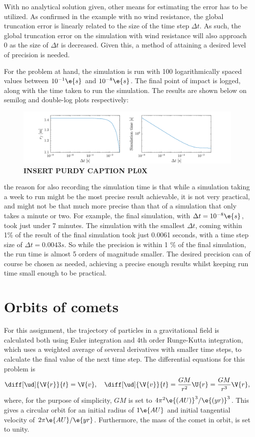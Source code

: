 \documentclass[a4paper,10pt]{article} 	%
\numberwithin{equation}{section}
\begin{document}
 	With no analytical solution given, other means for estimating the error has to be utilized. As confirmed in the example with no wind resistance, the global truncation error is linearly related to the size of the time step $ \Delta t $. As such, the global truncation error on the simulation with wind resistance will also approach 0 as the size of $ \Delta t $ is decreased. Given this, a method of attaining a desired level of precision is needed.
 	
 	For the problem at hand, the simulation is run with 100 logarithmically spaced values between $ 10^{-1} \e{s}$ and $ 10^{-8} \e{s} $. The final point of impact is logged, along with the time taken to run the simulation. The results are shown below on semilog and double-log plots respectively:
 	\begin{figure}[H]
 		\centering
 		\includegraphics[width = \linewidth]{simtime.pdf}
 		\caption{\textbf{INSERT PURDY CAPTION PL0X}}
 		\label{fig:simtime}
 	\end{figure}
 	the reason for also recording the simulation time is that while a simulation taking a week to run might be the most precise result achievable, it is not very practical, and might not be that much more precise than that of a simulation that only takes a minute or two. For example, the final simulation, with $ \Delta t = 10^{-8} \e{s} $, took just under 7 minutes. The simulation with the smallest $ \Delta t $, coming within 1\% of the result of the final simulation took just 0.0061 seconds, with a time step size of $ \Delta t = 0.0043 s $. So while the precision is within 1 \% of the final simulation, the run time is almost 5 orders of magnitude smaller. The desired precision can of course be chosen as needed, achieving a precise enough results whilst keeping run time small enough to be practical.
 	
 	
 	\section{Orbits of comets}
 	For this assignment, the trajectory of particles in a gravitational field is calculated both using Euler integration and 4th order Runge-Kutta integration, which uses a weighted average of several derivatives with smaller time steps, to calculate the final value of the next time step. The differential equations for this problem is
 	\begin{equation}
 		\diff[\ud]{\V{r}}{t} = \V{v}, \quad \diff[\ud]{\V{v}}{t} = \frac{GM}{r^2}\U{r} = \frac{GM}{r^3}\V{r},
 	\end{equation}
 	where, for the purpose of simplicity, $ GM $ is set to $ 4\pi^2 \e{(AU)}^3/\e{(yr)}^3 $. This gives a circular orbit for an initial radius of $ 1 \e{AU} $ and initial tangential velocity of $ 2 \pi \e{AU}/\e{yr} $. Furthermore, the mass of the comet in orbit, is set to unity. 
 	
\end{document}
